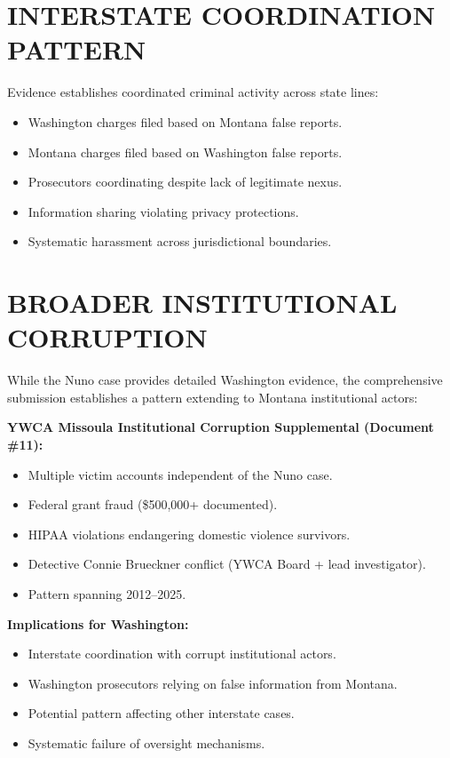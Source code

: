 \documentclass[12pt,oneside]{article}
\begin{document}
\begin{flushleft}
\section*{INTERSTATE COORDINATION PATTERN}

Evidence establishes coordinated criminal activity across state lines:

\begin{itemize}
\item Washington charges filed based on Montana false reports.
\item Montana charges filed based on Washington false reports.
\item Prosecutors coordinating despite lack of legitimate nexus.
\item Information sharing violating privacy protections.
\item Systematic harassment across jurisdictional boundaries.
\end{itemize}

\section*{BROADER INSTITUTIONAL CORRUPTION}

While the Nuno case provides detailed Washington evidence, the comprehensive submission establishes a pattern extending to Montana institutional actors:

\textbf{YWCA Missoula Institutional Corruption Supplemental (Document \#11):}

\begin{itemize}
\item Multiple victim accounts independent of the Nuno case.
\item Federal grant fraud (\$500,000+ documented).
\item HIPAA violations endangering domestic violence survivors.
\item Detective Connie Brueckner conflict (YWCA Board + lead investigator).
\item Pattern spanning 2012--2025.
\end{itemize}

\textbf{Implications for Washington:}

\begin{itemize}
\item Interstate coordination with corrupt institutional actors.
\item Washington prosecutors relying on false information from Montana.
\item Potential pattern affecting other interstate cases.
\item Systematic failure of oversight mechanisms.
\end{itemize}


\end{flushleft}
\end{document}
